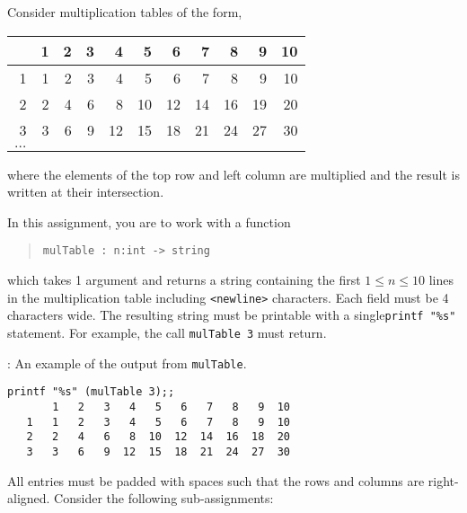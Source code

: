 Consider multiplication tables of the form,
\begin{center}
  \begin{tabular}[c]{r|rrrrrrrrrr}
    & 1& 2& 3& 4& 5& 6& 7& 8& 9& 10\\\hline
   1 & 1& 2& 3& 4& 5& 6& 7& 8& 9& 10\\
   2 & 2& 4& 6& 8& 10& 12& 14& 16& 19& 20\\
   3 & 3& 6& 9& 12& 15& 18& 21& 24& 27& 30\\
    $\hdots$&&&&&&&&&&  
  \end{tabular}
\end{center}
where the elements of the top row and left column are multiplied and
the result is written at their intersection.

In this assignment, you are to work with a function
\begin{quote}
  \mbox{\lstinline!mulTable : n:int -> string!}
\end{quote}
which takes 1 argument and returns a string containing the first
$1\leq n\leq 10$ lines in the multiplication table including
\lstinline{<newline>} characters. Each field must be 4 characters wide. The resulting string must be
printable with a single\lstinline!printf "%s"!%
statement. For example, the call \mbox{\lstinline!mulTable 3!} must
return.
  \begin{codeNOutput}[label=mulTab]{: An example of the output from \lstinline!mulTable!.}
\begin{lstlisting}
printf "%s" (mulTable 3);;
       1   2   3   4   5   6   7   8   9  10
   1   1   2   3   4   5   6   7   8   9  10
   2   2   4   6   8  10  12  14  16  18  20
   3   3   6   9  12  15  18  21  24  27  30
\end{lstlisting}
\end{codeNOutput}
All entries must be padded with spaces such that the rows and columns
are right-aligned. Consider the following sub-assignments:
